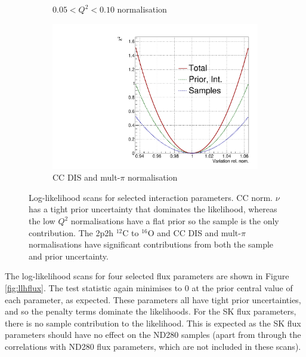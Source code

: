 \begin{figure}[!htbp]
\begin{subfigure}{.49\textwidth}
  \caption{$0.05 < Q^2 < 0.10$ normalisation}
\end{subfigure}
\begin{subfigure}{.49\textwidth}
  \centering
  \includegraphics[width=0.7\linewidth]{figs/llh/CC_DIS_MultPi_Norm_Nubar_llh.pdf}
  \caption{CC DIS and mult-$\pi$ normalisation}
\end{subfigure}
\caption{Log-likelihood scans for selected interaction parameters. CC norm. $\nu$ has a tight prior uncertainty that dominates the likelihood, whereas the low $Q^2$ normalisations have a flat prior so the sample is the only contribution. The 2p2h $^{12}$C to $^{16}$O and CC DIS and mult-$\pi$ normalisations have significant contributions from both the sample and prior uncertainty.}
\label{fig:llhxsec} 
\end{figure}

The log-likelihood scans for four selected flux parameters are shown in Figure \ref{fig:llhflux}. The test statistic again minimises to 0 at the prior central value of each parameter, as expected. These parameters all have tight prior uncertainties, and so the penalty terms dominate the likelihoods. For the SK flux parameters, there is no sample contribution to the likelihood. This is expected as the SK flux parameters should have no effect on the ND280 samples (apart from through the correlations with ND280 flux parameters, which are not included in these scans). 

